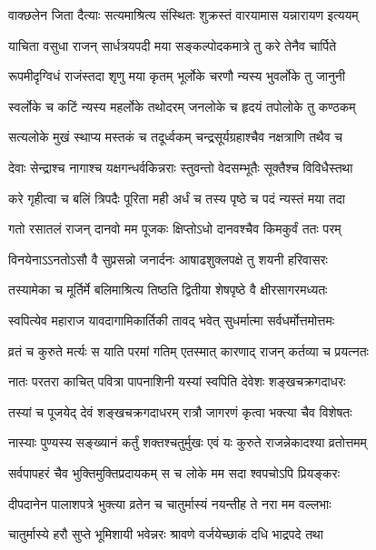 \twolineshloka
{वाक्छलेन जिता दैत्याः सत्यमाश्रित्य संस्थितः}
{शुक्रस्तं वारयामास यन्नारायण इत्ययम्}%

\twolineshloka
{याचिता वसुधा राजन् सार्धत्रयपदी मया}
{सङ्कल्पोदकमात्रे तु करे तेनैव चार्पिते}%

\twolineshloka
{रूपमीदृग्विधं राजंस्तदा शृणु मया कृतम्}
{भूर्लोके चरणौ न्यस्य भुवर्लोके तु जानुनी}%

\twolineshloka
{स्वर्लोके च कटिं न्यस्य महर्लोके तथोदरम्}
{जनलोके च हृदयं तपोलोके तु कण्ठकम्}%

\twolineshloka
{सत्यलोके मुखं स्थाप्य मस्तकं च तदूर्ध्वकम्}
{चन्द्रसूर्यग्रहाश्चैव नक्षत्राणि तथैव च}%

\twolineshloka
{देवाः सेन्द्राश्च नागाश्च यक्षगन्धर्वकिन्नराः}
{स्तुवन्तो वेदसम्भूतैः सूक्तैश्च विविधैस्तथा}%

\twolineshloka
{करे गृहीत्वा च बलिं त्रिपदैः पूरिता मही}
{अर्धं च तस्य पृष्ठे च पदं न्यस्तं मया तदा}%

\twolineshloka
{गतो रसातलं राजन् दानवो मम पूजकः}
{क्षिप्तोऽधो दानवश्चैव किमकुर्वं ततः परम्}%

\twolineshloka
{विनयेनाऽऽनतोऽसौ वै सुप्रसन्नो जनार्दनः}
{आषाढशुक्लपक्षे तु शयनी हरिवासरः}%

\twolineshloka
{तस्यामेका च मूर्तिर्मे बलिमाश्रित्य तिष्ठति}
{द्वितीया शेषपृष्ठे वै क्षीरसागरमध्यतः}%

\twolineshloka
{स्वपित्येव महाराज यावदागामिकार्तिकी}
{तावद् भवेत् सुधर्मात्मा सर्वधर्मोत्तमोत्तमः}%

\twolineshloka
{व्रतं च कुरुते मर्त्यः स याति परमां गतिम्}
{एतस्मात् कारणाद् राजन् कर्तव्या च प्रयत्नतः}%

\twolineshloka
{नातः परतरा काचित् पवित्रा पापनाशिनी}
{यस्यां स्वपिति देवेशः शङ्खचक्रगदाधरः}%

\twolineshloka
{तस्यां च पूजयेद् देवं शङ्खचक्रगदाधरम्}
{रात्रौ जागरणं कृत्वा भक्त्या चैव विशेषतः}%

\twolineshloka
{नास्याः पुण्यस्य सङ्ख्यानं कर्तुं शक्तश्चतुर्मुखः}
{एवं यः कुरुते राजन्नेकादश्या व्रतोत्तमम्}%

\twolineshloka
{सर्वपापहरं चैव भुक्तिमुक्तिप्रदायकम्}
{स च लोके मम सदा श्वपचोऽपि प्रियङ्करः}%

\twolineshloka
{दीपदानेन पालाशपत्रे भुक्त्या व्रतेन च}
{चातुर्मास्यं नयन्तीह ते नरा मम वल्लभाः}%

\twolineshloka
{चातुर्मास्ये हरौ सुप्ते भूमिशायी भवेन्नरः}
{श्रावणे वर्जयेच्छाकं  दधि भाद्रपदे तथा}%


